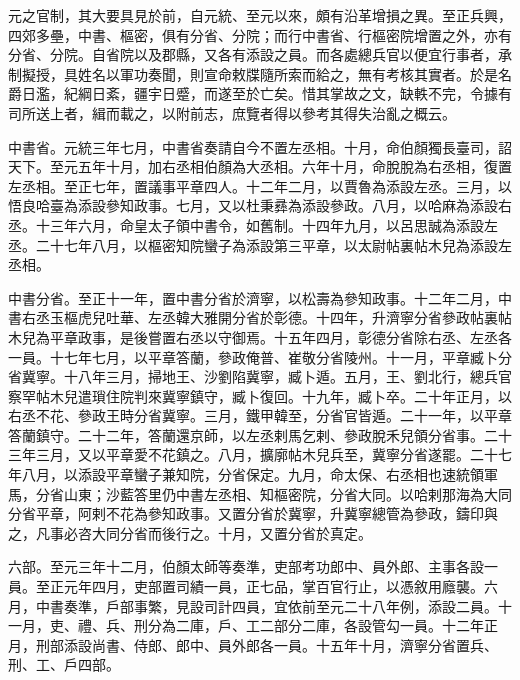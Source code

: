 
\begin{pinyinscope}

 元之官制，其大要具見於前，自元統、至元以來，頗有沿革增損之異。至正兵興，四郊多壘，中書、樞密，俱有分省、分院；而行中書省、行樞密院增置之外，亦有分省、分院。自省院以及郡縣，又各有添設之員。而各處總兵官以便宜行事者，承制擬授，具姓名以軍功奏聞，則宣命敕牒隨所索而給之，無有考核其實者。於是名爵日濫，紀綱日紊，疆宇日蹙，而遂至於亡矣。惜其掌故之文，缺軼不完，令據有司所送上者，緝而載之，以附前志，庶覽者得以參考其得失治亂之概云。



 中書省。元統三年七月，中書省奏請自今不置左丞相。十月，命伯顏獨長臺司，詔天下。至元五年十月，加右丞相伯顏為大丞相。六年十月，命脫脫為右丞相，復置左丞相。至正七年，置議事平章四人。十二年二月，以賈魯為添設左丞。三月，以悟良哈臺為添設參知政事。七月，又以杜秉彞為添設參政。八月，以哈麻為添設右丞。十三年六月，命皇太子領中書令，如舊制。十四年九月，以呂思誠為添設左丞。二十七年八月，以樞密知院蠻子為添設第三平章，以太尉帖裏帖木兒為添設左丞相。



 中書分省。至正十一年，置中書分省於濟寧，以松壽為參知政事。十二年二月，中書右丞玉樞虎兒吐華、左丞韓大雅開分省於彰德。十四年，升濟寧分省參政帖裏帖木兒為平章政事，是後嘗置右丞以守御焉。十五年四月，彰德分省除右丞、左丞各一員。十七年七月，以平章答蘭，參政俺普、崔敬分省陵州。十一月，平章臧卜分省冀寧。十八年三月，掃地王、沙劉陷冀寧，臧卜遁。五月，王、劉北行，總兵官察罕帖木兒遣瑣住院判來冀寧鎮守，臧卜復回。十九年，臧卜卒。二十年正月，以右丞不花、參政王時分省冀寧。三月，鐵甲韓至，分省官皆遁。二十一年，以平章答蘭鎮守。二十二年，答蘭還京師，以左丞剌馬乞剌、參政脫禾兒領分省事。二十三年三月，又以平章愛不花鎮之。八月，擴廓帖木兒兵至，冀寧分省遂罷。二十七年八月，以添設平章蠻子兼知院，分省保定。九月，命太保、右丞相也速統領軍馬，分省山東；沙藍答里仍中書左丞相、知樞密院，分省大同。以哈剌那海為大同分省平章，阿剌不花為參知政事。又置分省於冀寧，升冀寧總管為參政，鑄印與之，凡事必咨大同分省而後行之。十月，又置分省於真定。



 六部。至元三年十二月，伯顏太師等奏準，吏部考功郎中、員外郎、主事各設一員。至正元年四月，吏部置司績一員，正七品，掌百官行止，以憑敘用廕襲。六月，中書奏準，戶部事繁，見設司計四員，宜依前至元二十八年例，添設二員。十一月，吏、禮、兵、刑分為二庫，戶、工二部分二庫，各設管勾一員。十二年正月，刑部添設尚書、侍郎、郎中、員外郎各一員。十五年十月，濟寧分省置兵、刑、工、戶四部。




\end{pinyinscope}
